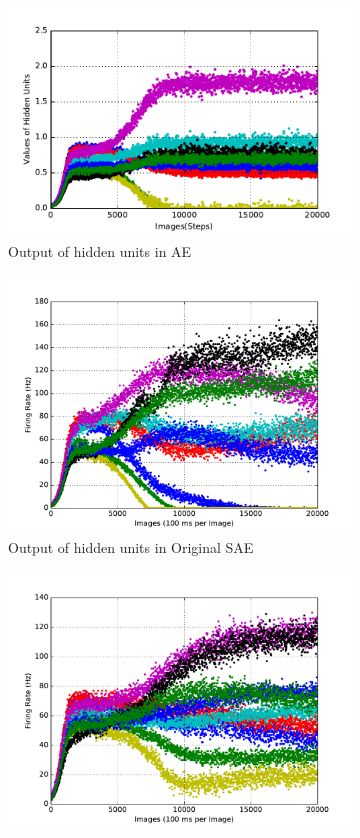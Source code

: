 \begin{figure}
\begin{subfigure}[t]{0.32\textwidth}
		\includegraphics[width=\textwidth]{pics_sdlm/21_exp_AE_noise/exp3_hid_s_2.pdf}
		\caption{Output of hidden units in AE}
	\end{subfigure}
	\begin{subfigure}[t]{0.32\textwidth}
		\includegraphics[width=\textwidth]{pics_sdlm/00_exp_SAE_Orig/exp3_hid_s_2.pdf}
		\caption{Output of hidden units in Original SAE}
	\end{subfigure}
	\begin{subfigure}[t]{0.32\textwidth}
		\includegraphics[width=\textwidth]{pics_sdlm/07_exp_SAE_all_long/exp3_hid_s_2.pdf}

\end{subfigure}
\end{figure}
